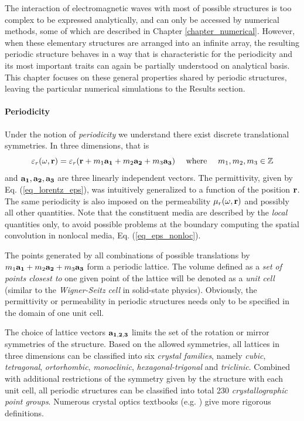 The interaction of electromagnetic waves with most of possible structures is too complex to be expressed analytically, and can only be accessed by numerical methods, some of which are described in Chapter \ref{chapter_numerical}. However, when these elementary structures are arranged into an infinite array, the resulting periodic structure behaves in a way that is characteristic for the periodicity and its most important traits can again be partially understood on analytical basis.
This chapter focuses on these general properties shared by periodic structures, leaving the particular numerical simulations to the Results section.

\paragraph{Periodicity}%
Under the notion of \textit{periodicity} we understand there exist discrete translational symmetries. In three dimensions, that is 
\begin{equation} \varepsilon_r(\omega,{\mathbf{r}}) = \varepsilon_r({\mathbf{r}} + m_1 {\mathbf{a_1}} + m_2 {\mathbf{a_2}} + m_3 {\mathbf{a_3}}) \quad\text{ where }\quad m_1, m_2, m_3 \in \mathbb{Z} \label{eq_trsym}\end{equation}
and ${\mathbf{a_1}}, {\mathbf{a_2}}, {\mathbf{a_3}}$ are three linearly independent vectors. The permittivity, given by Eq. (\ref{eq_lorentz_eps}), was intuitively generalized to a function of the position ${\mathbf{r}}$. The same periodicity is also imposed on the permeability $\mu_r(\omega,{\mathbf{r}})$ and possibly all other quantities. Note that the constituent media are described by the \textit{local} quantities only, to avoid possible problems at the boundary computing the spatial convolution  in nonlocal media, Eq. (\ref{eq_eps_nonloc}). 

The points generated by all combinations of possible translations by $m_1 {\mathbf{a_1}} + m_2 {\mathbf{a_2}} + m_3 {\mathbf{a_3}}$ form a periodic lattice.
The volume defined as a \textit{set of points closest to} one given point of the lattice will be denoted as a \textit{unit cell} (similar to the \textit{Wigner-Seitz cell} in solid-state physics). Obviously, the permittivity or permeability in periodic structures needs only to be specified in the domain of one unit cell.

The choice of lattice vectors ${\mathbf{a_{1,2,3}}}$ limits the set of the rotation or mirror symmetries of the structure. Based on the allowed symmetries, all lattices in three dimensions can be classified into six \textit{crystal families}, namely \textit{cubic}, \textit{tetragonal}, \textit{ortorhombic}, \textit{monoclinic}, \textit{hexagonal-trigonal} and \textit{triclinic}. Combined with additional restrictions of the symmetry given by the structure with each unit cell, all periodic structures can be classified into total 230 \textit{crystallographic point groups}. Numerous crystal optics textbooks (e.g. \cite[p. 678]{born1999book}) give more rigorous definitions. 


